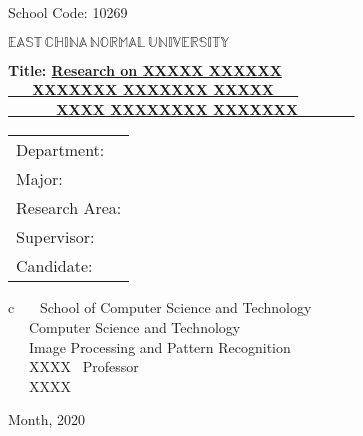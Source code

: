 \newpage

\pagestyle{empty}

\hskip 1.4cm {\large School Code: 10269}\\
\hspace*{\fill}{\large Student Number: 51170000000}

\vskip 2cm

\begin{center}
{\Huge $\mathbb{EAST}\,\mathbb{CHINA}\,\mathbb{NORMAL}\,
\mathbb{UNIVERSITY}$}
\end{center}

\vskip 3cm

\begin{center}
{\erhao\bf  Title: \underline{Research on XXXXX XXXXXX }}\\
{\erhao\bf  \underline{~~~XXXXXXX XXXXXXX XXXXX~~~}}\\
{\erhao\bf  \underline{~~~~~~XXXX XXXXXXXX XXXXXXX~~~~~~~}}
\end{center}

\vskip 2cm {\large
\begin{center}
\begin{tabular}{l}
Department:\\
Major:\\
Research Area:\\
Supervisor:\\
Candidate:
\end{tabular}
\begin{tabular}c
~~~School of Computer Science and Technology \\
\hline ~~~Computer Science and Technology  \\
\hline ~~~Image Processing and Pattern Recognition\\
\hline ~~~XXXX~ Professor  \\
\hline ~~~XXXX  \\
\hline
\end{tabular}
\end{center}}

\vskip 30mm

\begin{center}
{\Large Month, 2020}
\end{center}
